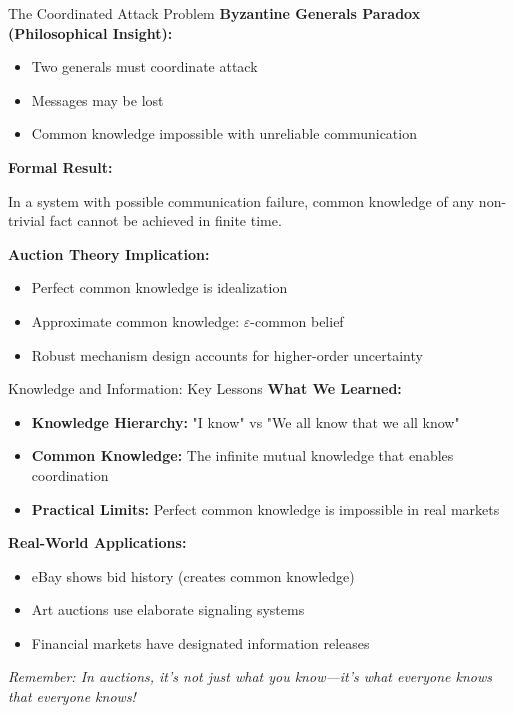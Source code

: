 \documentclass[xcolor={x11names}]{beamer}
\begin{document}
\begin{frame}{The Coordinated Attack Problem}
\textbf{Byzantine Generals Paradox (Philosophical Insight):}
\begin{itemize}
  \item Two generals must coordinate attack
  \item Messages may be lost
  \item Common knowledge impossible with unreliable communication
\end{itemize}

\textbf{Formal Result:}
\begin{theorem}
In a system with possible communication failure, common knowledge of any non-trivial fact cannot be achieved in finite time.
\end{theorem}

\textbf{Auction Theory Implication:}
\begin{itemize}
  \item Perfect common knowledge is idealization
  \item Approximate common knowledge: $\varepsilon$-common belief
  \item Robust mechanism design accounts for higher-order uncertainty
\end{itemize}
\end{frame}

\begin{frame}{Knowledge and Information: Key Lessons}
\textbf{What We Learned:}
\begin{itemize}
  \item \textbf{Knowledge Hierarchy:} "I know" vs "We all know that we all know"
  \item \textbf{Common Knowledge:} The infinite mutual knowledge that enables coordination
  \item \textbf{Practical Limits:} Perfect common knowledge is impossible in real markets
\end{itemize}

\textbf{Real-World Applications:}
\begin{itemize}
  \item eBay shows bid history (creates common knowledge)
  \item Art auctions use elaborate signaling systems
  \item Financial markets have designated information releases
\end{itemize}

\textit{Remember: In auctions, it's not just what you know—it's what everyone knows that everyone knows!}
\end{frame}
\end{document}
